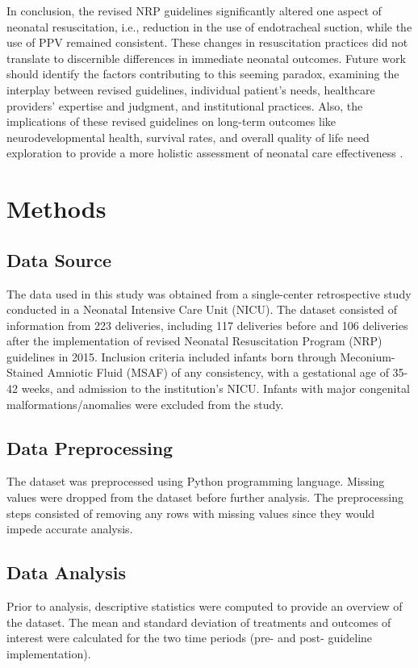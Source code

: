 \documentclass[11pt]{article}
\begin{document}
In conclusion, the revised NRP guidelines significantly altered one aspect of neonatal resuscitation, i.e., reduction in the use of endotracheal suction, while the use of PPV remained consistent. These changes in resuscitation practices did not translate to discernible differences in immediate neonatal outcomes. Future work should identify the factors contributing to this seeming paradox, examining the interplay between revised guidelines, individual patient's needs, healthcare providers' expertise and judgment, and institutional practices. Also, the implications of these revised guidelines on long-term outcomes like neurodevelopmental health, survival rates, and overall quality of life need exploration to provide a more holistic assessment of neonatal care effectiveness \cite{Brent2013SheddingLO}.

\section*{Methods}

\subsection*{Data Source}
The data used in this study was obtained from a single-center retrospective study conducted in a Neonatal Intensive Care Unit (NICU). The dataset consisted of information from 223 deliveries, including 117 deliveries before and 106 deliveries after the implementation of revised Neonatal Resuscitation Program (NRP) guidelines in 2015. Inclusion criteria included infants born through Meconium-Stained Amniotic Fluid (MSAF) of any consistency, with a gestational age of 35-42 weeks, and admission to the institution’s NICU. Infants with major congenital malformations/anomalies were excluded from the study.

\subsection*{Data Preprocessing}
The dataset was preprocessed using Python programming language. Missing values were dropped from the dataset before further analysis. The preprocessing steps consisted of removing any rows with missing values since they would impede accurate analysis. 

\subsection*{Data Analysis}
Prior to analysis, descriptive statistics were computed to provide an overview of the dataset. The mean and standard deviation of treatments and outcomes of interest were calculated for the two time periods (pre- and post- guideline implementation).
\end{document}

